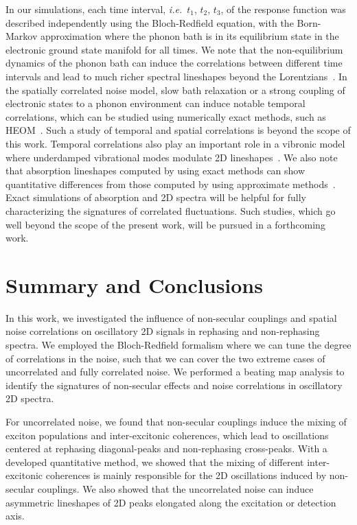 \documentclass[%
 reprint,%
 amssymb, amsmath,%
 aip,cha,%
]{revtex4-1}
\begin{document}
In our simulations, each time interval, {\it i.e.}~$t_1$, $t_2$, $t_3$, of the response function was described independently using the Bloch-Redfield equation, with the Born-Markov approximation where the phonon bath is in its equilibrium state in the electronic ground state manifold for all times. We note that the non-equilibrium dynamics of the phonon bath can induce the correlations between different time intervals and lead to much richer spectral lineshapes beyond the Lorentzians~\cite{MancalCPL12,OlsinaCP12}. In the spatially correlated noise model, slow bath relaxation or a strong coupling of electronic states to a phonon environment can induce notable temporal correlations, which can be studied using numerically exact methods, such as HEOM~\cite{KreisbeckJPCL2012,TanimuraJPSJ2006,StrumpferJCP2011}. Such a study of temporal and spatial correlations is beyond the scope of this work. Temporal correlations also play an important role in a vibronic model where underdamped vibrational modes modulate 2D lineshapes~\cite{NemethCPL08}. We also note that absorption lineshapes computed by using exact methods can show quantitative differences from those computed by using approximate methods~\cite{GelzinisJCP2015,DinhJCP2015,MaJCP2015}. Exact simulations of absorption and 2D spectra will be helpful for fully characterizing the signatures of correlated fluctuations. Such studies, which go well beyond the scope of the present work, will be pursued in a forthcoming work.


\section{Summary and Conclusions}

In this work,  we investigated the influence of non-secular couplings and spatial noise correlations on oscillatory 2D signals in rephasing and non-rephasing spectra. We employed the Bloch-Redfield formalism where we can tune the degree of correlations in the noise, such that we can cover the two extreme cases of uncorrelated and fully correlated noise.  We performed a beating map analysis to identify the signatures of non-secular effects and noise correlations in oscillatory 2D spectra.

For uncorrelated noise, we found that non-secular couplings induce the mixing of exciton populations and inter-excitonic coherences, which lead to oscillations centered at rephasing diagonal-peaks and non-rephasing cross-peaks. With a developed quantitative method, we showed that the mixing of different inter-excitonic coherences is mainly responsible for the 2D oscillations induced by non-secular couplings.  We also showed that the uncorrelated noise can induce asymmetric lineshapes of 2D peaks elongated along the excitation or detection axis.
\end{document}
